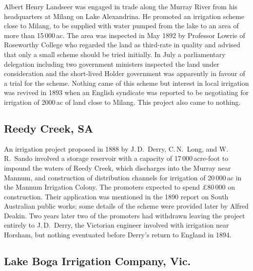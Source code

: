 Albert Henry Landseer was engaged in trade along the Murray River from
his headquarters at Milang on Lake Alexandrina.  He promoted an irrigation scheme close to Milang,
to be supplied with water pumped from the lake to an area of more than
15\,000\,ac.  The area was inspected
in May 1892 by Professor Lowrie of Roseworthy College who regarded the
land as third-rate in quality and advised that only a small scheme
should be tried initially.  In July
a parliamentary delegation including two government ministers
inspected the land under consideration and the short-lived Holder
government was apparently in favour of a trial for the
scheme.  Nothing came of this
scheme but interest in local irrigation was revived in 1893 when an
English syndicate was reported to be negotiating for irrigation of
2000\,ac of land close to Milang. This project also came to nothing.

\subsection*{Reedy Creek, SA}

An irrigation project proposed in 1888 by J.\,D.~Derry, C.\,N.~Long,
and W.\,R.~Sando involved a storage reservoir with a capacity of
17\,000\,acre-foot to impound the waters of Reedy Creek, which
discharges into the Murray near Mannum, and construction of
distribution channels for irrigation of 20\,000\,ac in the Mannum
Irrigation Colony.  The promoters expected to spend \pounds80\,000 on
construction.  Their application was mentioned in the 1890 report on
South Australian public works; some details of the scheme were
provided later by Alfred Deakin.  Two years later two
of the promoters had withdrawn leaving the project entirely to
J.\,D.~Derry, the Victorian engineer involved with irrigation near
Horsham, but nothing eventuated before Derry's return to England in
1894.

\subsection*{Lake Boga Irrigation Company, Vic.}

